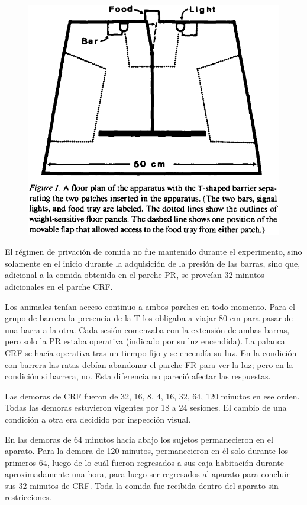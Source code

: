 \documentclass[a4paper,12pt]{article}
\begin{document}
\begin{figure}[hb]
	\begin{center}
		\includegraphics[scale=0.5]{Timberlake1987(1).png}
	\end{center}
\end{figure}

El régimen de privación de comida no fue mantenido durante el experimento, sino solamente en el inicio durante la adquisición de la presión de las barras, sino que, adicional a la comida obtenida en el parche PR, se proveían 32 minutos adicionales en el parche CRF.

Los animales tenían acceso continuo a ambos parches en todo momento. Para el grupo de barrera la presencia de la T los obligaba a viajar 80 cm para pasar de una barra a la otra. Cada sesión comenzaba con la extensión de ambas barras, pero solo la PR estaba operativa (indicado por su luz encendida). La palanca CRF se hacía operativa tras un tiempo fijo y se encendía su luz. En la condición con barrera las ratas debían abandonar el parche FR para ver la luz; pero en la condición si barrera, no. Esta diferencia no pareció afectar las respuestas.

Las demoras de CRF fueron de 32, 16, 8, 4, 16, 32, 64, 120 minutos en ese orden. Todas las demoras estuvieron vigentes por 18 a 24 sesiones. El cambio de una condición a otra era decidido por inspección visual. 

En las demoras de 64 minutos hacia abajo los sujetos permanecieron en el aparato. Para la demora de 120 minutos, permanecieron en él solo durante los primeros 64, luego de lo cuál fueron regresados a sus caja habitación durante aproximadamente una hora, para luego ser regresados al aparato para concluir sus 32 minutos de CRF. Toda la comida fue recibida dentro del aparato sin restricciones.
\end{document}
